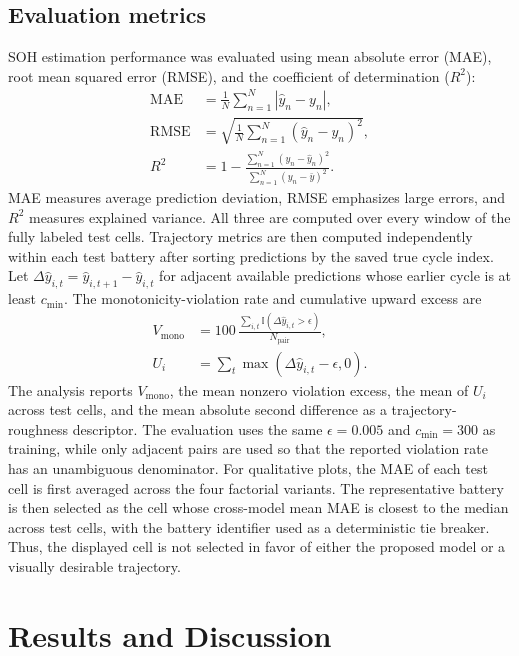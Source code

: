 \documentclass[a4paper,fleqn]{cas-dc}
\begin{document}
\subsection{Evaluation metrics}
\label{subsec:metrics}

SOH estimation performance was evaluated using mean absolute error (MAE), root mean squared error (RMSE), and the coefficient of determination ($R^2$):
\begin{align}
\mathrm{MAE} &= \frac{1}{N}\sum_{n=1}^{N}\left|\hat{y}_{n}-y_{n}\right|, \\
\mathrm{RMSE} &= \sqrt{\frac{1}{N}\sum_{n=1}^{N}\left(\hat{y}_{n}-y_{n}\right)^2}, \\
R^2 &= 1-\frac{\sum_{n=1}^{N}\left(y_n-\hat{y}_n\right)^2}{\sum_{n=1}^{N}\left(y_n-\bar{y}\right)^2}.
\end{align}
MAE measures average prediction deviation, RMSE emphasizes large errors, and $R^2$ measures explained variance. All three are computed over every window of the fully labeled test cells. Trajectory metrics are then computed independently within each test battery after sorting predictions by the saved true cycle index. Let $\Delta\hat{y}_{i,t}=\hat{y}_{i,t+1}-\hat{y}_{i,t}$ for adjacent available predictions whose earlier cycle is at least $c_{\min}$. The monotonicity-violation rate and cumulative upward excess are
\begin{align}
V_{\mathrm{mono}} &= 100\,\frac{\sum_{i,t}\mathbb{I}\!\left(\Delta\hat{y}_{i,t}>\epsilon\right)}{N_{\mathrm{pair}}},\\
U_i &= \sum_t \max\left(\Delta\hat{y}_{i,t}-\epsilon,0\right).
\end{align}
The analysis reports $V_{\mathrm{mono}}$, the mean nonzero violation excess, the mean of $U_i$ across test cells, and the mean absolute second difference as a trajectory-roughness descriptor. The evaluation uses the same $\epsilon=0.005$ and $c_{\min}=300$ as training, while only adjacent pairs are used so that the reported violation rate has an unambiguous denominator. For qualitative plots, the MAE of each test cell is first averaged across the four factorial variants. The representative battery is then selected as the cell whose cross-model mean MAE is closest to the median across test cells, with the battery identifier used as a deterministic tie breaker. Thus, the displayed cell is not selected in favor of either the proposed model or a visually desirable trajectory.
\section{Results and Discussion}
\label{sec:results}
\end{document}
